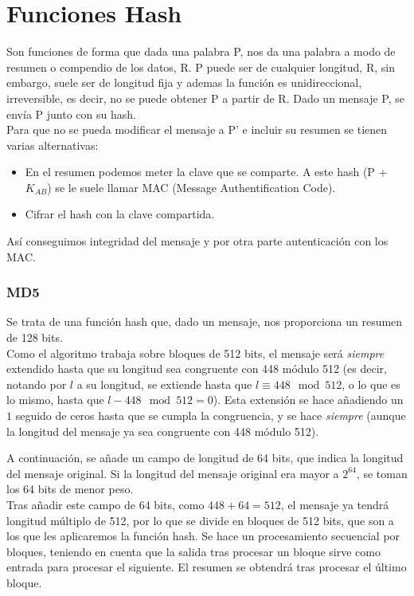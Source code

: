\section{Funciones Hash}

Son funciones de forma que dada una palabra P, nos da una palabra a modo de resumen o compendio de los datos, R. P puede ser de cualquier longitud, R, sin embargo, suele ser de longitud fija y ademas la función es unidireccional, irreversible, es decir, no se puede obtener P a partir de R. Dado un mensaje P, se envía P junto con su hash. \\

Para que no se pueda modificar el mensaje a P' e incluir su resumen se tienen varias alternativas: 
\begin{itemize}
    \item En el resumen podemos meter la clave que se comparte. A este hash (P + $K_{AB}$) se le suele llamar MAC (Message Authentification Code).
    \item Cifrar el hash con la clave compartida.
\end{itemize}

Así conseguimos integridad del mensaje y por otra parte autenticación con los MAC\@.

\subsubsection{\acrfull{MD5}}

Se trata de una función hash que, dado un mensaje, nos proporciona un resumen de 128 bits.\\

Como el algoritmo trabaja sobre bloques de 512 bits, el mensaje será \emph{siempre} extendido hasta que su longitud sea congruente con 448 módulo 512 (es decir, notando por $l$ a su longitud, se extiende hasta que $l\equiv 448\mod 512$, o lo que es lo mismo, hasta que $l-448\mod 512 = 0$). Esta extensión se hace añadiendo un $1$ seguido de ceros hasta que se cumpla la congruencia, y se hace \emph{siempre} (aunque la longitud del mensaje ya sea congruente con 448 módulo 512).

A continuación, se añade un campo de longitud de 64 bits, que indica la longitud del mensaje original. Si la longitud del mensaje original era mayor a $2^{64}$, se toman los 64 bits de menor peso.\\

Tras añadir este campo de 64 bits, como $448+64=512$, el mensaje ya tendrá longitud múltiplo de 512, por lo que se divide en bloques de 512 bits, que son a los que les aplicaremos la función hash. Se hace un procesamiento secuencial por bloques, teniendo en cuenta que la salida tras procesar un bloque sirve como entrada para procesar el siguiente. El resumen se obtendrá tras procesar el último bloque.


